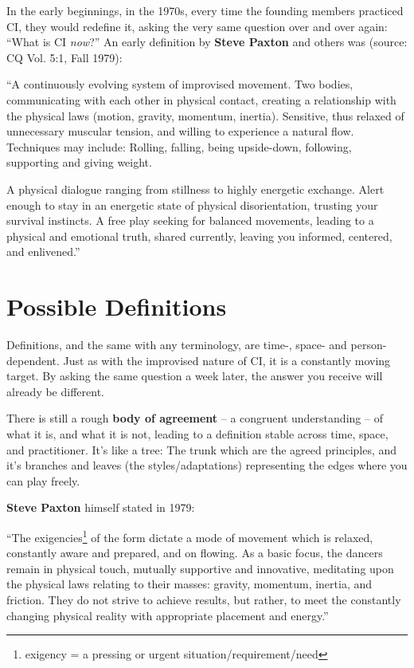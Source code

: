 In the early beginnings, in the 1970s, every time the founding members practiced CI, they would redefine it, asking the very same question over and over again: ``What is CI \textit{now}?'' An early definition by \textbf{Steve Paxton} and others was (source: CQ Vol. 5:1, Fall 1979):

\begin{displayquote}
``A continuously evolving system of improvised movement.
Two bodies, communicating with each other in physical contact, creating a relationship with the physical laws (motion, gravity, momentum, inertia).
Sensitive, thus relaxed of unnecessary muscular tension, and willing to experience a natural flow.
Techniques may include: Rolling, falling, being upside-down, following, supporting and giving weight.

A physical dialogue ranging from stillness to highly energetic exchange.
Alert enough to stay in an energetic state of physical disorientation, trusting your survival instincts.
A free play seeking for balanced movements, leading to a physical and emotional truth, shared currently, leaving you informed, centered, and enlivened.''
\end{displayquote}

\section{Possible Definitions}\label{sec:possible-definitions}

Definitions, and the same with any terminology, are time-, space- and person-dependent.
Just as with the improvised nature of CI, it is a constantly moving target.
By asking the same question a week later, the answer you receive will already be different.

There is still a rough \textbf{body of agreement} -- a congruent understanding -- of what it is, and what it is not, leading to a definition stable across time, space, and practitioner.
It's like a tree: The trunk which are the agreed principles, and it's branches and leaves (the styles/adaptations) representing the edges where you can play freely.

\textbf{Steve Paxton} himself stated in 1979:
\begin{displayquote}
	``The exigencies\footnote{exigency = a pressing or urgent situation/requirement/need} of the form dictate a mode of movement which is relaxed, constantly aware and prepared, and on flowing.
	As a basic focus, the dancers remain in physical touch, mutually supportive and innovative, meditating upon the physical laws relating to their masses: gravity, momentum, inertia, and friction.
	They do not strive to achieve results, but rather, to meet the constantly changing physical reality with appropriate placement and energy.''
\end{displayquote}


